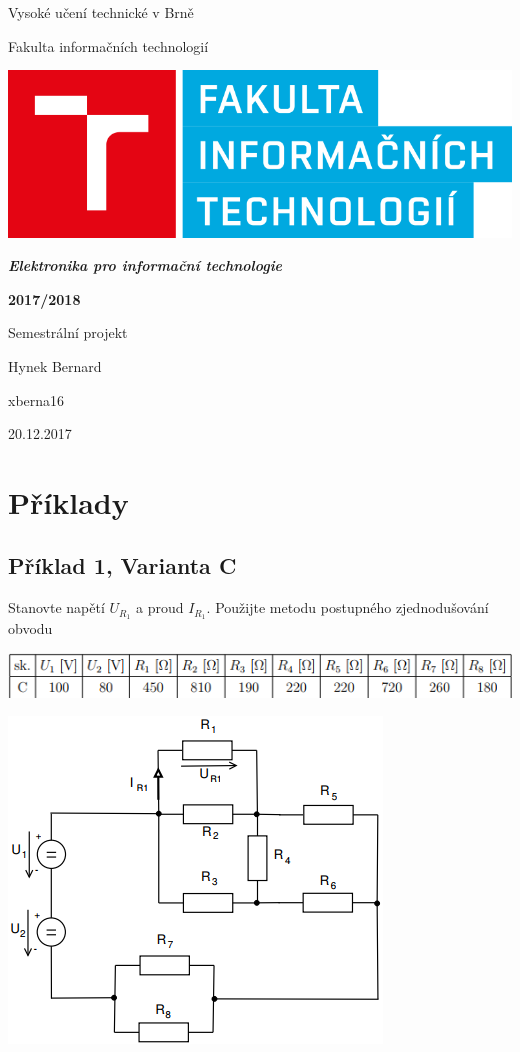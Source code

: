 \documentclass{article}
\begin{document}
\centerline{\sc \LARGE Vysoké učení technické v Brně}
\vspace{.5pc}
\centerline{\sc \large Fakulta informačních technologií}

\vspace{5pc}
\centerline{\includegraphics[scale=.4]{fit}}
\vspace{5pc}

\centerline{\large{\textit{\textbf{Elektronika pro informační technologie}}}}
\vspace{1pc}
\centerline{\large{\textbf{2017/2018}}}

\vspace{5pc}
\centerline{\sc \Large Semestrální projekt}
\vspace{1pc}
\centerline{\sc \large Hynek Bernard}
\centerline{xberna16}
\centerline{20.12.2017}
\clearpage

\tableofcontents
\clearpage
\section{Příklady}
\subsection{Příklad 1, Varianta C}
\vspace{3pc}

\centerline{Stanovte napětí $U_{R_1}$ a proud $ I_{R_1}$. Použijte metodu postupného zjednodušování obvodu}
\vspace{1pc}
\centerline{\includegraphics{hodnoty1}}
\vspace{2pc}
\centerline{\includegraphics{zadani1}}
\vspace{2pc}
\end{document}
